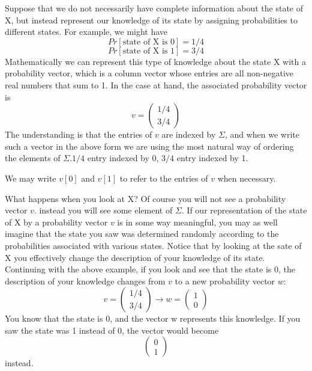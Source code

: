 Suppose that we do not necessarily have complete information about the state of X, but instead represent our knowledge of its state by assigning probabilities to different states. For example, we might have
\[
Pr[\text{state of X is 0}]=1/4
\]
\[
Pr[\text{state of X is 1}]=3/4
\]
Mathematically we can represent this type of knowledge about the state X with a probability vector, which is a column vector whose entries are all non-negative real numbers that sum to 1. In the case at hand, the associated probability vector is
\[
v=\begin{pmatrix} 1/4 \\ 3/4 \end{pmatrix}
\]
The understanding is that the entries of $v$ are indexed by $\Sigma$, and when we write such a vector in the above form we are using the most natural way of ordering the elements of $\Sigma$.$1/4$ entry indexed by 0, $3/4$ entry indexed by 1.

We may write $v[0]$ and $v[1]$ to refer to the entries of $v$ when necessary.

What happens when you look at X? Of course you will not see a probability vector $v$. instead you will see some element of $\Sigma$. If our representation of the state of X by a probability vector $v$ is in some way meaningful, you may as well imagine that the state you saw was determined randomly according to the probabilities associated with various states. Notice that by looking at the sate of X you effectively change the description of your knowledge of its state. Continuing with the above example, if you look and see that the state is 0, the description of your knowledge changes from $v$ to a new probability vector $w$:
\[
v=\begin{pmatrix} 1/4 \\ 3/4 \end{pmatrix} \rightarrow w=\begin{pmatrix} 1 \\ 0 \end{pmatrix}
\]
You know that the state is 0, and the vector w represents this knowledge. If you saw the state was 1 instead of 0, the vector would become
\[
\begin{pmatrix} 0 \\ 1 \end{pmatrix}
\]
instead.

